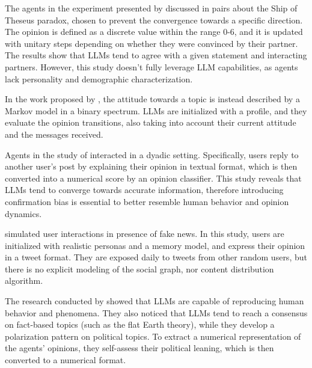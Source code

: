 The agents in the experiment presented by \citet{cau2025languagedrivenopiniondynamicsagentbased} discussed in pairs about the Ship of Theseus paradox, chosen to prevent the convergence towards a specific direction.
The opinion is defined as a discrete value within the range 0-6, and it is updated with unitary steps depending on whether they were convinced by their partner.
The results show that LLMs tend to agree with a given statement and interacting partners. However, this study doesn't fully leverage LLM capabilities, as agents lack personality and demographic characterization.

In the work proposed by \citet{gao2023s3socialnetworksimulationlarge}, the attitude towards a topic is instead described by a Markov model in a binary spectrum. LLMs are initialized with a profile, and they evaluate the opinion transitions, also taking into account their current attitude and the messages received.

Agents in the study of \citet{chuang2024simulatingopiniondynamicsnetworks} interacted in a dyadic setting. Specifically, users reply to another user's post by explaining their opinion in textual format, which is then converted into a numerical score by an opinion classifier.
This study reveals that LLMs tend to converge towards accurate information, therefore introducing confirmation bias is essential to better resemble human behavior and opinion dynamics.

\citet{Liu_2024} simulated user interactions in presence of fake news. In this study, users are initialized with realistic personas and a memory model, and express their opinion in a tweet format. They are exposed daily to tweets from other random users, but there is no explicit modeling of the social graph, nor content distribution algorithm.

The research conducted by \citet{piao2025emergencehumanlikepolarizationlarge} showed that LLMs are capable of reproducing human behavior and phenomena. They also noticed that LLMs tend to reach a consensus on fact-based topics (such as the flat Earth theory), while they develop a polarization pattern on political topics.
To extract a numerical representation of the agents' opinions, they self-assess their political leaning, which is then converted to a numerical format.



